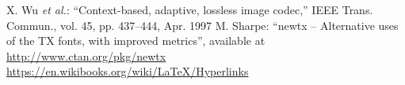 \documentclass[10pt]{article}
\begin{document}
\def\etal{{\it et al.}}
\begin{thebibliography}{9}
  X. Wu \etal: ``Context-based, adaptive, 
	 lossless image codec,'' IEEE Trans. Commun., vol. 45, pp. 437--444, 
	 Apr. 1997
	 M. Sharpe: ``newtx -- Alternative uses of the TX fonts, with improved metrics'',
	 available at \url{http://www.ctan.org/pkg/newtx}
	 \url{https://en.wikibooks.org/wiki/LaTeX/Hyperlinks}
\end{thebibliography}

\end{document}
